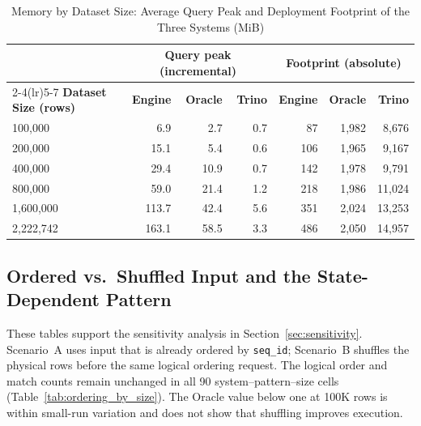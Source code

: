\documentclass[preprint,12pt,times,a4paper]{elsarticle}
\begin{document}
\begin{table}[t]
\centering\small

\begin{tabular}{lrrrrrr}
\toprule
 & \multicolumn{3}{c}{\textbf{Query peak (incremental)}} & \multicolumn{3}{c}{\textbf{Footprint (absolute)}} \\
\cmidrule(lr){2-4}\cmidrule(lr){5-7}
\textbf{Dataset Size (rows)} & \textbf{Engine} & \textbf{Oracle} & \textbf{Trino} & \textbf{Engine} & \textbf{Oracle} & \textbf{Trino} \\
\midrule
100,000 & 6.9 & 2.7 & 0.7 & 87 & 1,982 & 8,676 \\
200,000 & 15.1 & 5.4 & 0.6 & 106 & 1,965 & 9,167 \\
400,000 & 29.4 & 10.9 & 0.7 & 142 & 1,978 & 9,791 \\
800,000 & 59.0 & 21.4 & 1.2 & 218 & 1,986 & 11,024 \\
1,600,000 & 113.7 & 42.4 & 5.6 & 351 & 2,024 & 13,253 \\
2,222,742 & 163.1 & 58.5 & 3.3 & 486 & 2,050 & 14,957 \\
\bottomrule
\end{tabular}
\caption{Memory by Dataset Size: Average Query Peak and Deployment Footprint of the Three Systems (MiB)}
\label{tab:memory_cache}
\end{table}

\subsection{Ordered vs.\ Shuffled Input and the State-Dependent Pattern}
\label{app:sensitivity}

These tables support the sensitivity analysis in
Section~\ref{sec:sensitivity}. Scenario~A uses input that is already ordered
by \texttt{seq\_id}; Scenario~B shuffles the physical rows before the same
logical ordering request. The logical order and match counts remain unchanged
in all 90 system--pattern--size cells (Table~\ref{tab:ordering_by_size}). The
Oracle value below one at 100K rows is within small-run variation and does not
show that shuffling improves execution.
\end{document}
